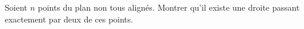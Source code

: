 Soient $n$ points du plan non tous alignés. Montrer qu'il existe une droite passant exactement par deux de ces points.
